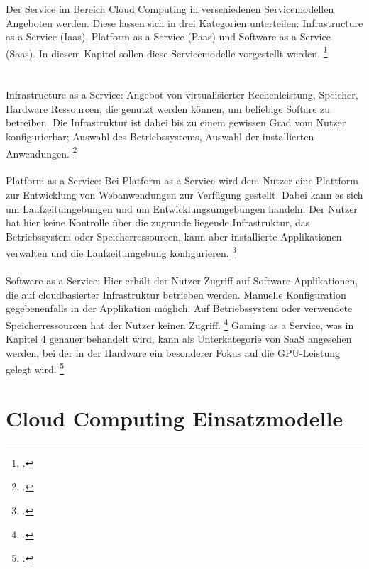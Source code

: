 \documentclass[12pt,toc=bib,toc=listof]{scrreprt}
\begin{document}
Der Service im Bereich Cloud Computing in verschiedenen Servicemodellen Angeboten werden. Diese lassen sich 
in drei Kategorien unterteilen:
 Infrastructure as a Service (Iaas), Platform as a Service (Paas) und Software as a Service (Saas). 
 In diesem Kapitel sollen diese Servicemodelle vorgestellt werden. \footcite [Vgl.] [] {Riasanow.2020}
 \\ 
\\ \\ 
Infrastructure as a Service: Angebot von virtualisierter Rechenleistung, Speicher, Hardware Ressourcen, die genutzt werden können, um beliebige Softare zu betreiben.
Die Infrastruktur ist dabei bis zu einem gewissen Grad vom Nutzer konfigurierbar; Auswahl des Betriebssystems, Auswahl der installierten Anwendungen. \footcite [Vgl.] [] {Riasanow.2020}
\\ \\
Platform as a Service: Bei Platform as a Service wird dem Nutzer eine Plattform zur Entwicklung von Webanwendungen zur Verfügung gestellt. Dabei kann es sich 
um Laufzeitumgebungen und um Entwicklungsumgebungen handeln. Der Nutzer hat hier keine Kontrolle über die zugrunde liegende Infrastruktur, 
das Betriebssystem oder Speicherressourcen, kann aber installierte Applikationen verwalten und die Laufzeitumgebung konfigurieren. \footcite [Vgl.] [] {Riasanow.2020}
\\ \\
Software as a Service: Hier erhält der Nutzer Zugriff auf Software-Applikationen, die auf cloudbasierter Infrastruktur betrieben werden.
Manuelle Konfiguration gegebenenfalls in der Applikation möglich. Auf Betriebssystem oder verwendete Speicherressourcen hat der Nutzer keinen Zugriff. \footcite [Vgl.] [] {Riasanow.2020}
Gaming as a Service, was in Kapitel 4 genauer behandelt wird, kann als Unterkategorie von SaaS angesehen werden, bei der in der Hardware ein besonderer Fokus auf die 
GPU-Leistung gelegt wird. \footcite [Vgl.] [] {Soliman.2013}

\section{Cloud Computing Einsatzmodelle} %
\label{sec:Cloud Computing Einsatzmodelle}
\end{document}
